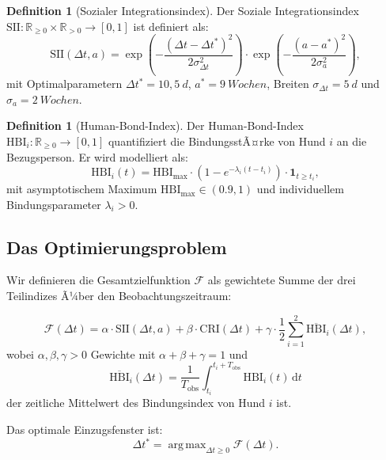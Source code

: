 ﻿\documentclass[12pt, a4paper]{article}
\theoremstyle{plain}
\theoremstyle{definition}
\newtheorem{definition}[theorem]{Definition}
\theoremstyle{remark}
\newcommand{\HBI}{\mathrm{HBI}}
\newcommand{\SII}{\mathrm{SII}}
\newcommand{\CRI}{\mathrm{CRI}}
\newcommand{\R}{\mathbb{R}}
\newcommand{\dt}{\Delta t}
\DeclareMathOperator*{\argmax}{arg\,max}
\begin{document}
\begin{definition}[Sozialer Integrationsindex]\label{def:sii}
Der Soziale Integrationsindex $\SII : \R_{\geq 0} \times \R_{>0} \to [0,1]$
ist definiert als:
\begin{equation}
  \SII(\dt, a) = \exp\!\left(-\frac{(\dt - \dt^*)^2}{2\sigma_{\dt}^2}\right)
                \cdot \exp\!\left(-\frac{(a - a^*)^2}{2\sigma_{a}^2}\right),
  \label{eq:sii}
\end{equation}
mit Optimalparametern $\dt^* = 10{,}5\ \si{d}$, $a^* = 9\ \si{Wochen}$,
Breiten $\sigma_{\dt} = 5\ \si{d}$ und $\sigma_a = 2\ \si{Wochen}$.
\end{definition}

\begin{definition}[Human-Bond-Index]\label{def:hbi}
Der Human-Bond-Index $\HBI_i : \R_{\geq 0} \to [0,1]$ quantifiziert die
BindungsstÃ¤rke von Hund $i$ an die Bezugsperson. Er wird modelliert als:
\begin{equation}
  \HBI_i(t) = \HBI_{\mathrm{max}} \cdot \left(1 - e^{-\lambda_i (t - t_i)}\right)
              \cdot \mathbf{1}_{t \geq t_i},
  \label{eq:hbi}
\end{equation}
mit asymptotischem Maximum $\HBI_{\mathrm{max}} \in (0.9, 1)$ und
individuellem Bindungsparameter $\lambda_i > 0$.
\end{definition}

\subsection{Das Optimierungsproblem}

Wir definieren die Gesamtzielfunktion $\mathcal{F}$ als gewichtete Summe der
drei Teilindizes Ã¼ber den Beobachtungszeitraum:

\begin{equation}
  \mathcal{F}(\dt) = \alpha \cdot \SII(\dt, a) + \beta \cdot \CRI(\dt)
                   + \gamma \cdot \frac{1}{2}\sum_{i=1}^{2} \overline{\HBI}_i(\dt),
  \label{eq:gesamtziel}
\end{equation}
wobei $\alpha, \beta, \gamma > 0$ Gewichte mit $\alpha + \beta + \gamma = 1$ und
\begin{equation}
  \overline{\HBI}_i(\dt) = \frac{1}{T_{\mathrm{obs}}} \int_{t_i}^{t_i + T_{\mathrm{obs}}} \HBI_i(t)\,\mathrm{d}t
\end{equation}
der zeitliche Mittelwert des Bindungsindex von Hund $i$ ist.

Das optimale Einzugsfenster ist:
\begin{equation}
  \dt^* = \argmax_{\dt \geq 0} \mathcal{F}(\dt).
  \label{eq:optimum}
\end{equation}
\end{document}
